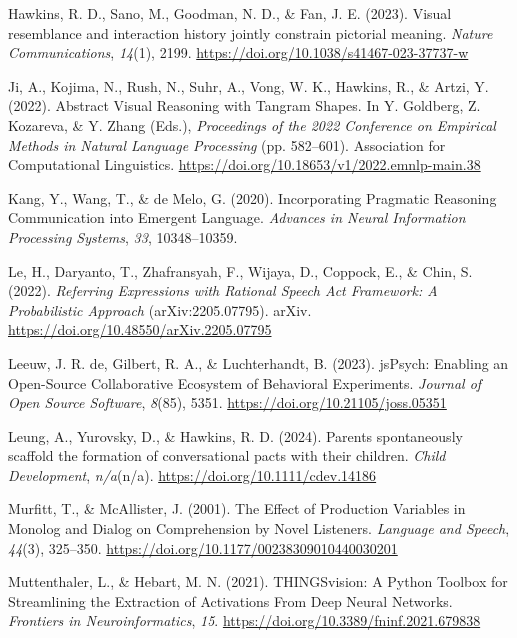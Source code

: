 \documentclass[10pt, letterpaper]{article}
\begin{document}
\begin{CSLReferences}{1}{0}
Hawkins, R. D., Sano, M., Goodman, N. D., \& Fan, J. E. (2023). Visual
resemblance and interaction history jointly constrain pictorial meaning.
\emph{Nature Communications}, \emph{14}(1), 2199.
\url{https://doi.org/10.1038/s41467-023-37737-w}

Ji, A., Kojima, N., Rush, N., Suhr, A., Vong, W. K., Hawkins, R., \&
Artzi, Y. (2022). Abstract {Visual Reasoning} with {Tangram Shapes}. In
Y. Goldberg, Z. Kozareva, \& Y. Zhang (Eds.), \emph{Proceedings of the
2022 {Conference} on {Empirical Methods} in {Natural Language
Processing}} (pp. 582--601). Association for Computational Linguistics.
\url{https://doi.org/10.18653/v1/2022.emnlp-main.38}

Kang, Y., Wang, T., \& de Melo, G. (2020). Incorporating {Pragmatic
Reasoning Communication} into {Emergent Language}. \emph{Advances in
{Neural Information Processing Systems}}, \emph{33}, 10348--10359.

Le, H., Daryanto, T., Zhafransyah, F., Wijaya, D., Coppock, E., \& Chin,
S. (2022). \emph{Referring {Expressions} with {Rational Speech Act
Framework}: {A Probabilistic Approach}} (arXiv:2205.07795). arXiv.
\url{https://doi.org/10.48550/arXiv.2205.07795}

Leeuw, J. R. de, Gilbert, R. A., \& Luchterhandt, B. (2023). {jsPsych}:
{Enabling} an {Open-Source Collaborative Ecosystem} of {Behavioral
Experiments}. \emph{Journal of Open Source Software}, \emph{8}(85),
5351. \url{https://doi.org/10.21105/joss.05351}

Leung, A., Yurovsky, D., \& Hawkins, R. D. (2024). Parents spontaneously
scaffold the formation of conversational pacts with their children.
\emph{Child Development}, \emph{n/a}(n/a).
\url{https://doi.org/10.1111/cdev.14186}

Murfitt, T., \& McAllister, J. (2001). The {Effect} of {Production
Variables} in {Monolog} and {Dialog} on {Comprehension} by {Novel
Listeners}. \emph{Language and Speech}, \emph{44}(3), 325--350.
\url{https://doi.org/10.1177/00238309010440030201}

Muttenthaler, L., \& Hebart, M. N. (2021). {THINGSvision}: {A Python
Toolbox} for {Streamlining} the {Extraction} of {Activations From Deep
Neural Networks}. \emph{Frontiers in Neuroinformatics}, \emph{15}.
\url{https://doi.org/10.3389/fninf.2021.679838}


\end{CSLReferences}
\end{document}
